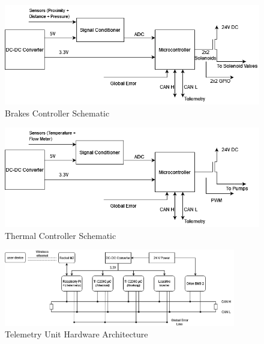 \begin{enumerate}
    \begin{figure}[H]
        \centering
        \includegraphics[width=0.9\linewidth]{texfiles/elec/eimg/Brakesystems}
        \caption{Brakes Controller Schematic} 
        \label{fig:Brakes Controller Schematic}
    \end{figure}
 \begin{figure}[H]
        \centering
        \includegraphics[width=0.9\linewidth]{texfiles/elec/eimg/thermalsystems}
        \caption{Thermal Controller Schematic}
        \label{fig:Thermal Controller Schematic}
    \end{figure}
 \begin{figure}[H]
        \centering
        \includegraphics[width=0.9\textwidth]{texfiles/elec/eimg/telemetrysystems}
        \caption{Telemetry Unit Hardware Architecture}
        \label{fig:Telemetry Unit Hardware Architecture}
    \end{figure}


\end{enumerate}
